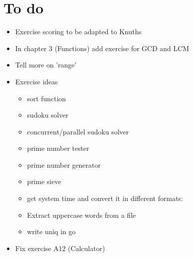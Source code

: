 \section{To do}

\begin{itemize}
\item
Exercise scoring to be adapted to Knuths
\item
In chapter 3 (Functions) add exercise for GCD and LCM
\item
Tell more on 'range'
\item
Exercise ideas
\begin{itemize}
\item
sort function
\item
sudoku solver
\item
concurrent/parallel sudoku solver
\item
prime number tester
\item
prime number generator
\item
prime sieve
\item
get system time and convert it in different formats:
\item
Extract uppercase words from a file
\item
write uniq in go
\end{itemize}
\item
Fix exercise A12 (Calculator)
\end{itemize}
